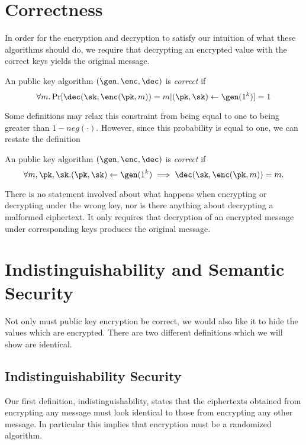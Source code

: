 \section{Correctness}

In order for the encryption and decryption to satisfy our intuition of what these
algorithms should do, we require that decrypting an encrypted value with the
correct keys yields the original message.

\begin{definition}[Correctness]
    An public key algorithm $(\gen, \enc, \dec)$ is \emph{correct} if
    \begin{equation*}
        \forall m . \Pr[\dec(\sk, \enc(\pk, m))=m | (\pk,\sk) \gets \gen(1^k)] = 1
    \end{equation*}
\end{definition}

Some definitions may relax this constraint from being equal to one to being greater
than $1-neg(\cdot)$. However, since this probability is equal to one, we can restate
the definition

\begin{lemma}[Correctness]
    An public key algorithm $(\gen, \enc, \dec)$ is \emph{correct} if
    \begin{equation*}
        \forall m, \pk,\sk . (\pk,\sk) \gets \gen(1^k) \implies \dec(\sk, \enc(\pk, m))=m.
    \end{equation*}
\end{lemma}

There is no statement involved about what happens when encrypting or decrypting
under the wrong key, nor is there anything about decrypting a malformed ciphertext.
It only requires that decryption of an encrypted message under corresponding
keys produces the original message.

\section{Indistinguishability and Semantic Security}

Not only must public key encryption be correct, we would also like it to hide
the values which are encrypted. There are two different definitions which we
will show are identical.

\subsection{Indistinguishability Security}
Our first definition, indistinguishability, states that the ciphertexts
obtained from encrypting any message must look identical to those from encrypting
any other message. In particular this implies that encryption must be a randomized
algorithm.


